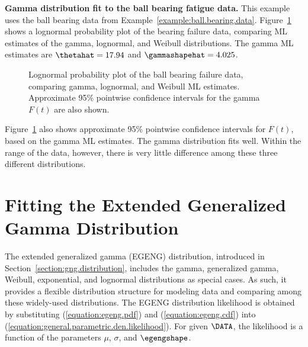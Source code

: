 \begin{example}
\label{example:lzbearing.gamma}
{\bf Gamma distribution fit to the ball bearing fatigue data.}  This
example uses the ball bearing data from
Example~\ref{example:ball.bearing.data}.
Figure~\ref{figure:bearing.gamma.gmleprobplot.ps} shows a lognormal
probability plot of the bearing failure data, comparing ML estimates
of the gamma, lognormal, and Weibull distributions.  The gamma ML
estimates are $\thetahat=17.94$ and $\gammashapehat=4.025$.
\begin{figure}
\caption{Lognormal probability plot of the ball bearing failure data, 
comparing gamma, lognormal, and Weibull ML estimates.  Approximate
95\% pointwise confidence intervals for the gamma $F(t)$ are also
shown.}
\label{figure:bearing.gamma.gmleprobplot.ps}
\end{figure}
Figure~\ref{figure:bearing.gamma.gmleprobplot.ps} also
shows approximate 95\% pointwise confidence intervals for $F(t)$,
based on the gamma ML estimates. The gamma distribution fits well.
Within the range of the data, however, there is very little difference
among these three different distributions.
\end{example}

\section{Fitting the Extended Generalized Gamma Distribution}
\label{section:ml.gen.gamma}
The extended generalized gamma (EGENG) distribution, introduced in
Section~\ref{section:gng.distribution}, includes the gamma,
generalized gamma, Weibull, exponential, and lognormal distributions
as special cases.  As such, it provides a flexible distribution
structure for modeling data and comparing among these widely-used
distributions. The EGENG distribution likelihood is obtained by
substituting (\ref{equation:egeng.pdf}) and
(\ref{equation:egeng.cdf}) into
(\ref{equation:general.parametric.den.likelihood}).  For given
$\DATA$, the likelihood is a function of the parameters $\mu$, $\sigma$, and
$\egengshape$.

